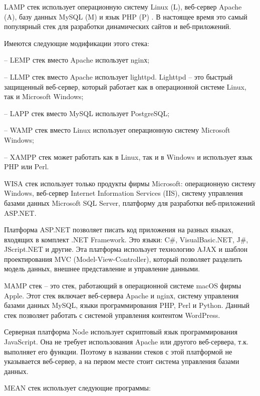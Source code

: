 
LAMP стек \cite{davidovsky-vibor-1} использует операционную систему Linux (L), веб-сервер Apache (A), базу данных MySQL (M) и язык PHP (P) \cite{davidovsky-vibor-php}.
В настоящее время это самый популярный стек для разработки динамических сайтов и веб-приложений.

Имеются следующие модификации этого стека: 

-- LEMP стек вместо Apache использует nginх;

-- LLMP стек вместо Apache использует lighttpd. Lighttpd -- это быстрый защищенный веб-сервер, который работает как в операционной системе Linux, так и Microsoft Windows;

-- LAPP стек вместо MySQL использует PostgreSQL;

-- WAMP стек вместо Linux использует операционную систему Microsoft Windows;

-- XAMPP стек может работать как в Linux, так и в Windows и использует язык PHP или Perl.


WISA стек использует только продукты фирмы Microsoft: операционную систему Windows, веб-сервер Internet Information Services (IIS), систему управления базами данных Microsoft SQL Server, платформу для разработки веб-приложений ASP.NET.

Платформа ASP.NET позволяет писать код приложения на разных языках, входящих в комплект .NET Framework.
Это языки: C\#, VisualBasic.NET, J\#, JScript.NET и другие.
Эта платформа использует технологию AJAX и шаблон проектирования MVC (Model-View-Controller), который позволяет разделить модель данных, внешнее представление и управление данными.


MAMP стек – это стек, работающий в операционной системе macOS фирмы Apple.
Этот стек включает веб-сервера Apache и nginх, систему управления базами данных MySQL, языки программирования PHP, Perl и Python.
Данный стек позволяет работать с системой управления контентом WordPress.

Серверная платформа Node \cite{davidovsky-vibor-NODE} использует скриптовый язык программирования JavaScript.
Она не требует использования Apache или другого веб-сервера, т.к. выполняет его функции.
Поэтому в названии стеков с этой платформой не указывается веб-сервер, а на первом месте стоит система управления базами данных.


MEAN стек \cite{davidovsky-vibor-mean} использует следующие программы:

